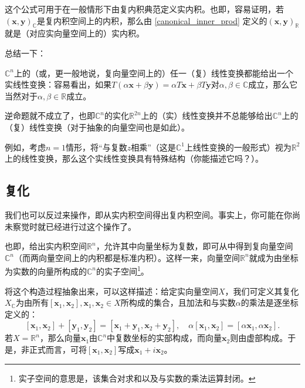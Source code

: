 这个公式可用于在一般情形下由复内积典范定义实内积。也即，容易证明，若$(\mathbf{x},\mathbf{y})_\mathbb{C}$是复内积空间上的内积，那么由 \eqref{canonical_inner_prod} 定义的$(\mathbf{x},\mathbf{y})_\mathbb{R}$就是（对应实向量空间上的）实内积。

总结一下：
\begin{center}
\end{center}

\begin{remark*}
    $\mathbb{C}^{n}$上的（或，更一般地说，复向量空间上的）任一（复）线性变换都能给出一个实线性变换：容易看出，如果$T(\alpha\mathbf{x}+\beta\mathbf{y})=\alpha T\mathbf{x}+\beta T\mathbf{y}$对$\alpha,\beta\in\mathbb{C}$成立，那么它当然对于$\alpha,\beta\in\mathbb{R}$成立。

    逆命题就不成立了，也即$\mathbb{C}^{n}$的实化$\mathbb{R}^{2n}$上的（实）线性变换并不总能够给出$\mathbb{C}^{n}$上的（复）线性变换（对于抽象的向量空间也是如此）。

    例如，考虑$n=1$情形，将“与复数$z$相乘”（这是$\mathbb{C}^{1}$上线性变换的一般形式）视为$\mathbb{R}^{2}$上的线性变换，那么这个实线性变换具有特殊结构（你能描述它吗？）。
\end{remark*}

\subsection{复化}\label{subsec:complexification}

我们也可以反过来操作，即从实内积空间得出复内积空间。事实上，你可能在你尚未察觉时就已经进行过这个操作了。

也即，给出实内积空间$\mathbb{R}^n$，允许其中向量坐标为复数，即可从中得到复向量空间$\mathbb{C}^n$（而两向量空间上的内积都是标准内积）。这样一来，向量空间$\mathbb{R}^n$就成为由坐标为实数的向量所构成的$\mathbb{C}^n$的实子空间\footnote{实子空间的意思是，该集合对求和以及与实数的乘法运算封闭。}。

将这个构造过程抽象出来，可以这样描述：给定实向量空间$X$，我们可定义其复化$X_\mathbb{C}$为由所有$[\mathbf{x}_1,\mathbf{x}_2],\mathbf{x}_1,\mathbf{x}_2\in X$所构成的集合，且加法和与实数$\alpha$的乘法是逐坐标定义的：
\[[\mathbf{x}_1,\mathbf{x}_2]+[\mathbf{y}_1,\mathbf{y}_2]=[\mathbf{x}_1+\mathbf{y}_1,\mathbf{x}_2+\mathbf{y}_2],\quad\alpha[\mathbf{x}_1,\mathbf{x}_2]=[\alpha\mathbf{x}_1,\alpha\mathbf{x}_2].\]
若$X=\mathbb{R}^n$，那么向量$\mathbf{x}_1$由$\mathbb{C}^n$中复数坐标的实部构成，而向量$\mathbf{x}_2$则由虚部构成。于是，非正式而言，可将$[\mathbf{x}_1,\mathbf{x}_2]$写成$\mathbf{x}_1+i\mathbf{x}_2$。

